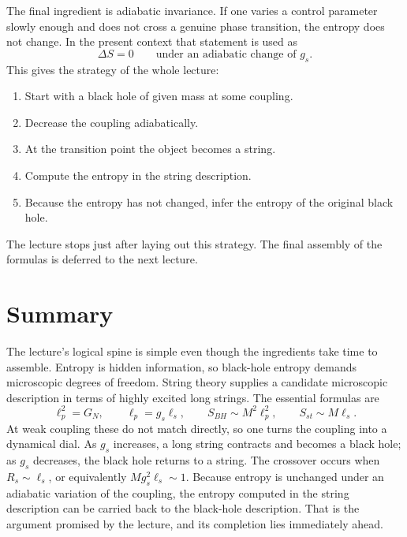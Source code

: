 The final ingredient is adiabatic invariance. If one varies a control parameter slowly enough and does not cross a genuine phase transition, the entropy does not change. In the present context that statement is used as
\begin{equation}
\Delta S=0
\qquad
\text{under an adiabatic change of } g_s.
\end{equation}
This gives the strategy of the whole lecture:
\begin{enumerate}
\item Start with a black hole of given mass at some coupling.
\item Decrease the coupling adiabatically.
\item At the transition point the object becomes a string.
\item Compute the entropy in the string description.
\item Because the entropy has not changed, infer the entropy of the original black hole.
\end{enumerate}
The lecture stops just after laying out this strategy. The final assembly of the formulas is deferred to the next lecture.

\section{Summary}

The lecture's logical spine is simple even though the ingredients take time to assemble. Entropy is hidden information, so black-hole entropy demands microscopic degrees of freedom. String theory supplies a candidate microscopic description in terms of highly excited long strings. The essential formulas are
\begin{equation}
\ell_p^2=G_N,
\qquad
\ell_p=g_s\ell_s,
\qquad
S_{BH}\sim M^2\ell_p^2,
\qquad
S_{st}\sim M\ell_s.
\end{equation}
At weak coupling these do not match directly, so one turns the coupling into a dynamical dial. As \(g_s\) increases, a long string contracts and becomes a black hole; as \(g_s\) decreases, the black hole returns to a string. The crossover occurs when \(R_s\sim \ell_s\), or equivalently \(Mg_s^2\ell_s\sim 1\). Because entropy is unchanged under an adiabatic variation of the coupling, the entropy computed in the string description can be carried back to the black-hole description. That is the argument promised by the lecture, and its completion lies immediately ahead.